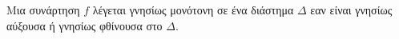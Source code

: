 Μια συνάρτηση $f$ λέγεται γνησίως μονότονη σε ένα διάστημα $\varDelta$ εαν είναι γνησίως αύξουσα ή γνησίως φθίνουσα στο $\varDelta$.
